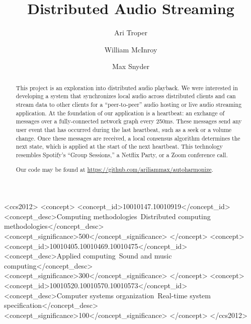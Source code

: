 \documentclass[%
               nonacm,sigconf,10pt]{acmart}
\begin{document}
\title{Distributed Audio Streaming}

\author{Ari Troper}
\author{William McInroy}
\author{Max Snyder}

\renewcommand{\shortauthors}{Ari Troper, William McInroy, Max Snyder}

\renewcommand\footnotetextcopyrightpermission[1]{}
\pagestyle{fancy}
\fancyfoot{}
\makeatletter
\let\@authorsaddresses\@empty
\makeatother

\begin{abstract}
This project is an exploration into distributed audio playback. We were interested in developing a system that synchronizes local audio across distributed clients and can stream data to other clients for a ``peer-to-peer'' audio hosting or live audio streaming application. At the foundation of our application is a heartbeat: an exchange of messages over a fully-connected network graph every 250ms. These messages send any user event that has occurred during the last heartbeat, such as a seek or a volume change. Once these messages are received, a local consensus algorithm determines the next state, which is applied at the start of the next heartbeat. This technology resembles Spotify's ``Group Sessions,'' a Netflix Party, or a Zoom conference call.

Our code may be found at \url{https://github.com/ariliammax/autoharmonize}.
\end{abstract}

\begin{CCSXML}
<ccs2012>
   <concept>
       <concept_id>10010147.10010919</concept_id>
       <concept_desc>Computing methodologies~Distributed computing methodologies</concept_desc>
       <concept_significance>500</concept_significance>
   </concept>
   <concept>
       <concept_id>10010405.10010469.10010475</concept_id>
       <concept_desc>Applied computing~Sound and music computing</concept_desc>
       <concept_significance>300</concept_significance>
   </concept>
   <concept>
       <concept_id>10010520.10010570.10010573</concept_id>
       <concept_desc>Computer systems organization~Real-time system specification</concept_desc>
       <concept_significance>100</concept_significance>
   </concept>
 </ccs2012>
\end{CCSXML}
\end{document}
